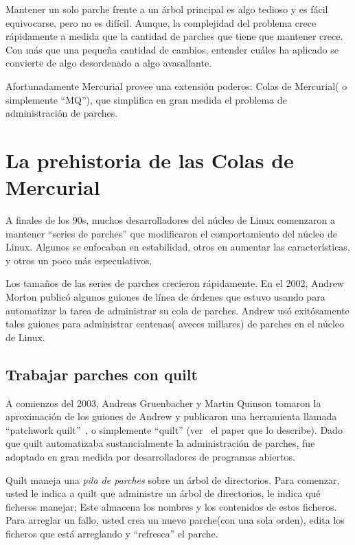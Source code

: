 Mantener un solo parche frente a un árbol principal es algo tedioso y
es fácil equivocarse, pero no es difícil.  Aunque, la complejidad del
problema crece rápidamente a medida que la cantidad de parches que
tiene que mantener crece.  Con más que una pequeña cantidad de
cambios, entender cuáles ha aplicado se convierte de algo desordenado
a algo avasallante.

Afortunadamente Mercurial provee una extensión poderos: Colas de
Mercurial( o simplemente ``MQ''), que simplifica en gran medida el
problema de administración de parches.

\section{La prehistoria de las Colas de Mercurial}
\label{sec:mq:history}

A finales de los 90s, muchos desarrolladores del núcleo de Linux
comenzaron a mantener ``series de parches'' que modificaron el
comportamiento del núcleo de Linux.  Algunos se enfocaban en
estabilidad, otros en aumentar las características, y otros un poco
más especulativos.

Los tamaños de las series de parches crecieron rápidamente.  En el
2002, Andrew Morton publicó algunos guiones de línea de órdenes que
estuvo usando para automatizar la tarea de administrar su cola de
parches.  Andrew usó exitósamente tales guiones para administrar
centenas( aveces millares) de parches en el núcleo de Linux.

\subsection{Trabajar parches con quilt}
\label{sec:mq:quilt}

A comienzos del 2003, Andreas Gruenbacher y Martin Quinson tomaron la
aproximación de los guiones de Andrew y publicaron una herramienta
llamada
``patchwork quilt''~\cite{web:quilt}, o simplemente ``quilt''
(ver~\cite{gruenbacher:2005} el paper que lo describe).  Dado que
quilt automatizaba sustancialmente la administración de parches, fue
adoptado en gran medida por desarrolladores de programas abiertos.

Quilt maneja una \emph{pila de parches} sobre un árbol de directorios.
Para comenzar, usted le indica a quilt que administre un árbol de
directorios, le indica qué ficheros manejar; Este almacena los nombres
y los contenidos de estos ficheros.  Para arreglar un fallo, usted
crea un nuevo parche(con una sola orden), edita los ficheros que está
arreglando y ``refresca'' el parche.


